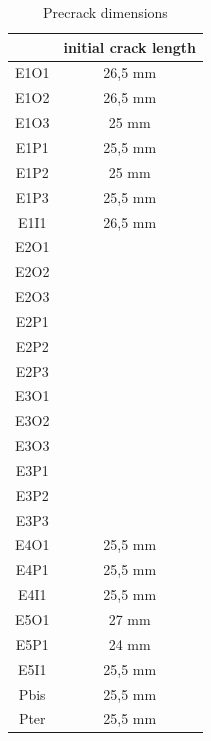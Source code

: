 \begin{table}[]
	\centering
	\begin{tabular}{c|c|}
		\cline{2-2}
		\multicolumn{1}{l|}{} & \multicolumn{1}{l|}{initial crack length} \\ \hline
		\multicolumn{1}{|c|}{\cellcolor[HTML]{F8CBAD}E1O1} & 26,5 mm \\ \hline
		\multicolumn{1}{|c|}{\cellcolor[HTML]{F8CBAD}E1O2} & 26,5 mm \\ \hline
		\multicolumn{1}{|c|}{\cellcolor[HTML]{F8CBAD}E1O3} & 25 mm \\ \hline
		\multicolumn{1}{|c|}{\cellcolor[HTML]{C65911}E1P1} & 25,5 mm \\ \hline
		\multicolumn{1}{|c|}{\cellcolor[HTML]{C65911}E1P2} & 25 mm \\ \hline
		\multicolumn{1}{|c|}{\cellcolor[HTML]{C65911}E1P3} & 25,5 mm \\ \hline
		\multicolumn{1}{|c|}{\cellcolor[HTML]{BF8F00}E1I1} & 26,5 mm \\ \hline
		\multicolumn{1}{|c|}{\cellcolor[HTML]{F8CBAD}E2O1} &  \\ \hline
		\multicolumn{1}{|c|}{\cellcolor[HTML]{F8CBAD}E2O2} &  \\ \hline
		\multicolumn{1}{|c|}{\cellcolor[HTML]{F8CBAD}E2O3} &  \\ \hline
		\multicolumn{1}{|c|}{\cellcolor[HTML]{C65911}E2P1} &  \\ \hline
		\multicolumn{1}{|c|}{\cellcolor[HTML]{C65911}E2P2} &  \\ \hline
		\multicolumn{1}{|c|}{\cellcolor[HTML]{C65911}E2P3} &  \\ \hline
		\multicolumn{1}{|c|}{\cellcolor[HTML]{F8CBAD}E3O1} &  \\ \hline
		\multicolumn{1}{|c|}{\cellcolor[HTML]{F8CBAD}E3O2} &  \\ \hline
		\multicolumn{1}{|c|}{\cellcolor[HTML]{F8CBAD}E3O3} &  \\ \hline
		\multicolumn{1}{|c|}{\cellcolor[HTML]{C65911}E3P1} &  \\ \hline
		\multicolumn{1}{|c|}{\cellcolor[HTML]{C65911}E3P2} &  \\ \hline
		\multicolumn{1}{|c|}{\cellcolor[HTML]{C65911}E3P3} &  \\ \hline
		\multicolumn{1}{|c|}{\cellcolor[HTML]{F8CBAD}E4O1} & 25,5 mm \\ \hline
		\multicolumn{1}{|c|}{\cellcolor[HTML]{C65911}E4P1} & 25,5 mm \\ \hline
		\multicolumn{1}{|c|}{\cellcolor[HTML]{BF8F00}E4I1} & 25,5 mm \\ \hline
		\multicolumn{1}{|c|}{\cellcolor[HTML]{F8CBAD}E5O1} & 27 mm \\ \hline
		\multicolumn{1}{|c|}{\cellcolor[HTML]{C65911}E5P1} & 24 mm \\ \hline
		\multicolumn{1}{|c|}{\cellcolor[HTML]{BF8F00}E5I1} & 25,5 mm \\ \hline
		\multicolumn{1}{|c|}{\cellcolor[HTML]{C65911}Pbis} & 25,5 mm \\ \hline
		\multicolumn{1}{|c|}{\cellcolor[HTML]{C65911}Pter} & 25,5 mm \\ \hline
	\end{tabular}
	\caption{Precrack dimensions}
	\label{tab:Tab11}
\end{table}
